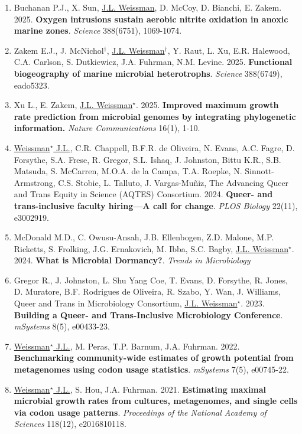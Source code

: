 \documentclass[]{res}
\begin{document}
\begin{resume}
\begin{enumerate}[leftmargin=*]
\item Buchanan P.J., X. Sun, \underline{J.L. Weissman}, D. McCoy, D. Bianchi, E. Zakem. 2025. {\bf Oxygen intrusions sustain aerobic nitrite 
oxidation in anoxic marine zones}. \emph{Science} 388(6751), 1069-1074.
 
 
\item Zakem E.J., J. McNichol$^\dagger$, \underline{J.L. Weissman}$^\dagger$, Y. Raut, L. Xu, E.R. Halewood, C.A. Carlson, S. Dutkiewicz, J.A. Fuhrman, N.M. Levine. 2025. {\bf Functional biogeography of marine microbial heterotrophs}. \emph{Science} 388(6749), eado5323.
 
\item Xu L., E. Zakem, \underline{J.L. Weissman$^\star$}. 2025. {\bf Improved maximum growth rate prediction from microbial genomes by integrating phylogenetic information.} \emph{Nature Communications} 16(1), 1-10.
 
\item \underline{Weissman$^\star$ J.L.}, C.R. Chappell, B.F.R. de Oliveira, N. Evans, A.C. Fagre, D. Forsythe, S.A. Frese, R. Gregor, S.L. Ishaq, J. Johnston, Bittu K.R., S.B. Matsuda, S. McCarren, M.O.A. de la Campa, T.A. Roepke, N. Sinnott-Armstrong, C.S. Stobie, L. Talluto, J. Vargas-Muñiz, The Advancing Queer and Trans Equity in Science (AQTES) Consortium. 2024. {\bf Queer- and trans-inclusive faculty hiring—A call for change}. \emph{PLOS Biology} 22(11), e3002919.

 \item McDonald M.D., C. Owusu-Ansah, J.B. Ellenbogen, Z.D. Malone, M.P. Ricketts, S. Frolking, J.G. Ernakovich, M. Ibba, S.C. Bagby, \underline{J.L. Weissman$^\star$}. 2024. {\bf What is Microbial Dormancy?}. \emph{Trends in Microbiology}

 \item Gregor R., J. Johnston, L. Shu Yang Coe, T. Evans, D. Forsythe, R. Jones, D. Muratore, B.F. Rodrigues de Oliveira, R. Szabo, Y. Wan, J. Williams, Queer and Trans in Microbiology Consortium, \underline{J.L. Weissman$^\star$}. 2023. {\bf Building a Queer- and Trans-Inclusive Microbiology Conference}. \emph{mSystems} 8(5), e00433-23.
 
 
  \item \underline{Weissman$^\star$ J.L.}, M. Peras, T.P. Barnum, J.A. Fuhrman. 2022. {\bf Benchmarking community-wide estimates of growth potential from metagenomes using codon usage statistics}. \emph{mSystems} 7(5), e00745-22.
  
\item \underline{Weissman$^\star$ J.L.}, S. Hou, J.A. Fuhrman. 2021. {\bf Estimating maximal microbial growth rates from cultures, metagenomes, and single cells via codon usage patterns}. \emph{Proceedings of the National Academy of Sciences} 118(12), e2016810118. 
 

\end{enumerate}
\end{resume}
\end{document}
